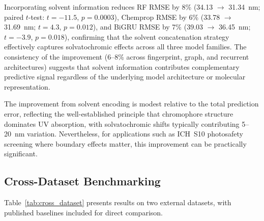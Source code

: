 Incorporating solvent information reduces RF RMSE by 8\% (34.13 $\to$ 31.34~nm; paired $t$-test: $t = -11.5$, $p = 0.0003$), Chemprop RMSE by 6\% (33.78 $\to$ 31.69~nm; $t = 4.3$, $p = 0.012$), and BiGRU RMSE by 7\% (39.03 $\to$ 36.45~nm; $t = -3.9$, $p = 0.018$), confirming that the solvent concatenation strategy effectively captures solvatochromic effects across all three model families.
The consistency of the improvement (6--8\% across fingerprint, graph, and recurrent architectures) suggests that solvent information contributes complementary predictive signal regardless of the underlying model architecture or molecular representation.

The improvement from solvent encoding is modest relative to the total prediction error, reflecting the well-established principle that chromophore structure dominates UV absorption\cite{flemingMolecular2010}, with solvatochromic shifts typically contributing 5--20~nm variation\cite{reichardt2011solvents}.
Nevertheless, for applications such as ICH~S10\cite{ICH2013S10} photosafety screening where boundary effects matter, this improvement can be practically significant.


\subsection{Cross-Dataset Benchmarking}
\label{sec:cross_dataset}

Table~\ref{tab:cross_dataset} presents results on two external datasets, with published baselines included for direct comparison.

